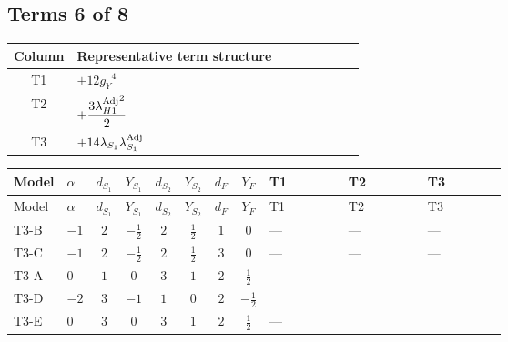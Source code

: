 \documentclass[8pt]{article}
\begin{document}
\begin{landscape}
\subsection*{Terms 6 of 8}
\begin{center}
\begin{tabular}{@{}c >{\raggedright\arraybackslash}p{0.82\linewidth}@{}}
\toprule
Column & Representative term structure \\
\midrule
T1 & \(\displaystyle +12 {g_Y}^4\) \\
\midrule
T2 & \(\displaystyle +\frac{3 {\lambda_{H1}^{\rm Adj}}^2}{2}\) \\
\midrule
T3 & \(\displaystyle +14 {\lambda_{S_1}} {\lambda_{S_1}^{\rm Adj}}\) \\
\midrule
\bottomrule
\end{tabular}
\end{center}
\smallskip
\tiny
\begin{longtable}{@{}llcccccc >{\raggedright\arraybackslash}p{0.21\linewidth} >{\raggedright\arraybackslash}p{0.21\linewidth} >{\raggedright\arraybackslash}p{0.21\linewidth}@{}}
\toprule
Model & $\alpha$ & $d_{S_1}$ & $Y_{S_1}$ & $d_{S_2}$ & $Y_{S_2}$ & $d_F$ & $Y_F$ & T1 & T2 & T3 \\
\midrule
\endfirsthead
\toprule
Model & $\alpha$ & $d_{S_1}$ & $Y_{S_1}$ & $d_{S_2}$ & $Y_{S_2}$ & $d_F$ & $Y_F$ & T1 & T2 & T3 \\
\midrule
\endhead
T3-B & $-1$ & $2$ & $-\frac{1}{2}$ & $2$ & $\frac{1}{2}$ & $1$ & $0$ & --- & --- & --- \\
\midrule
T3-C & $-1$ & $2$ & $-\frac{1}{2}$ & $2$ & $\frac{1}{2}$ & $3$ & $0$ & --- & --- & --- \\
\midrule
T3-A & $0$ & $1$ & $0$ & $3$ & $1$ & $2$ & $\frac{1}{2}$ & --- & --- & --- \\
\midrule
T3-D & $-2$ & $3$ & $-1$ & $1$ & $0$ & $2$ & $-\frac{1}{2}$ & \scriptsize\adjustbox{max width=\linewidth}{$\begin{gathered} +12 {g_Y}^4\end{gathered}$} & \scriptsize\adjustbox{max width=\linewidth}{$\begin{gathered} +\frac{3 {\lambda_{H1}^{\rm Adj}}^2}{2}\end{gathered}$} & \scriptsize\adjustbox{max width=\linewidth}{$\begin{gathered} +14 {\lambda_{S_1}} {\lambda_{S_1}^{\rm Adj}}\end{gathered}$} \\
\midrule
T3-E & $0$ & $3$ & $0$ & $3$ & $1$ & $2$ & $\frac{1}{2}$ & --- & \scriptsize\adjustbox{max width=\linewidth}{$\begin{gathered} +\frac{3 {\lambda_{H1}^{\rm Adj}}^2}{2}\end{gathered}$} & \scriptsize\adjustbox{max width=\linewidth}{$\begin{gathered} +14 {\lambda_{S_1}} {\lambda_{S_1}^{\rm Adj}}\end{gathered}$} \\
\midrule
\bottomrule
\end{longtable}
\clearpage

\end{landscape}
\end{document}

